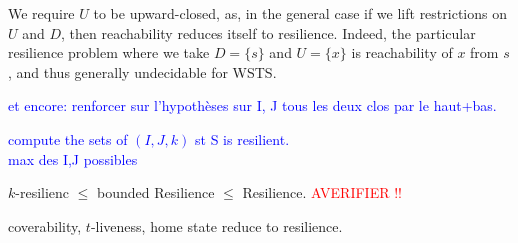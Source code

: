 
\begin{remark} 
We require $U$ to be upward-closed, as, in the general case if we lift restrictions on $U$ and $D$, then reachability reduces itself to resilience. Indeed, the particular resilience problem where we take $D = \{s\}$ and $U = \{x\}$ is reachability of $x$ from $s$, and thus generally undecidable for WSTS. 
\end{remark}

\textcolor{blue}{
et encore: renforcer sur l'hypothèses sur I, J tous les deux clos par le haut+bas.
}

\textcolor{blue}{
compute the sets of $(I,J,k)$ st S is resilient.\\
max des I,J possibles \\
}

\begin{remark} 
$k$-resilienc $\leq$ bounded Resilience $\leq$ Resilience.  \textcolor{red}{AVERIFIER !!}
\end{remark}


\begin{proposition}\label{reductions}
coverability, $t$-liveness, home state 
 reduce to resilience.
\end{proposition}



